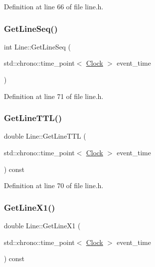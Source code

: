 Definition at line 66 of file line.\+h.

\mbox{\label{class_line_a8764cb987ec4af839f30411dc47a835a}} 
\subsubsection{\texorpdfstring{Get\+Line\+Seq()}{GetLineSeq()}}
{\footnotesize\ttfamily int Line\+::\+Get\+Line\+Seq (\begin{DoxyParamCaption}\item[{std\+::chrono\+::time\+\_\+point$<$ \mbox{\hyperlink{universe_8h_a0ef8d951d1ca5ab3cfaf7ab4c7a6fd80}{Clock}} $>$}]{event\+\_\+time }\end{DoxyParamCaption})\hspace{0.3cm}{\ttfamily [inline]}}



Definition at line 71 of file line.\+h.

\mbox{\label{class_line_a5b9419146093908e5c7d740ac384fe39}} 
\subsubsection{\texorpdfstring{Get\+Line\+T\+T\+L()}{GetLineTTL()}}
{\footnotesize\ttfamily double Line\+::\+Get\+Line\+T\+TL (\begin{DoxyParamCaption}\item[{std\+::chrono\+::time\+\_\+point$<$ \mbox{\hyperlink{universe_8h_a0ef8d951d1ca5ab3cfaf7ab4c7a6fd80}{Clock}} $>$}]{event\+\_\+time }\end{DoxyParamCaption}) const\hspace{0.3cm}{\ttfamily [inline]}}



Definition at line 70 of file line.\+h.

\mbox{\label{class_line_ab14245ec4348e925b6e0f860e9254308}} 
\subsubsection{\texorpdfstring{Get\+Line\+X1()}{GetLineX1()}}
{\footnotesize\ttfamily double Line\+::\+Get\+Line\+X1 (\begin{DoxyParamCaption}\item[{std\+::chrono\+::time\+\_\+point$<$ \mbox{\hyperlink{universe_8h_a0ef8d951d1ca5ab3cfaf7ab4c7a6fd80}{Clock}} $>$}]{event\+\_\+time }\end{DoxyParamCaption}) const\hspace{0.3cm}{\ttfamily [inline]}}



